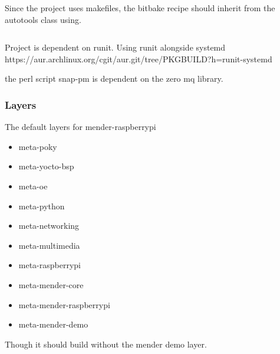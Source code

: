 \documentclass[../../main.tex]{subfiles}
\begin{document}
Since the project uses makefiles, the bitbake recipe should inherit from the autotools class using.
\inputminted{bitbake}{/home/aske/Bachelor/mender-raspberrypi/meta-mclur/recipes-mclurs/mclurs/mclurs_git.bb}


Project is dependent on runit. Using runit alongside systemd
https://aur.archlinux.org/cgit/aur.git/tree/PKGBUILD?h=runit-systemd

the perl script snap-pm is dependent on the zero mq library.


\subsubsection{Layers}%
\label{ssub:layers}

The default layers for mender-raspberrypi
\begin{itemize}
	\item meta-poky
	\item meta-yocto-bsp
	\item meta-oe
	\item meta-python
	\item meta-networking
	\item meta-multimedia
	\item meta-raspberrypi
	\item meta-mender-core
	\item meta-mender-raspberrypi
	\item meta-mender-demo
\end{itemize}
Though it should build without the mender demo layer.


\end{document}
